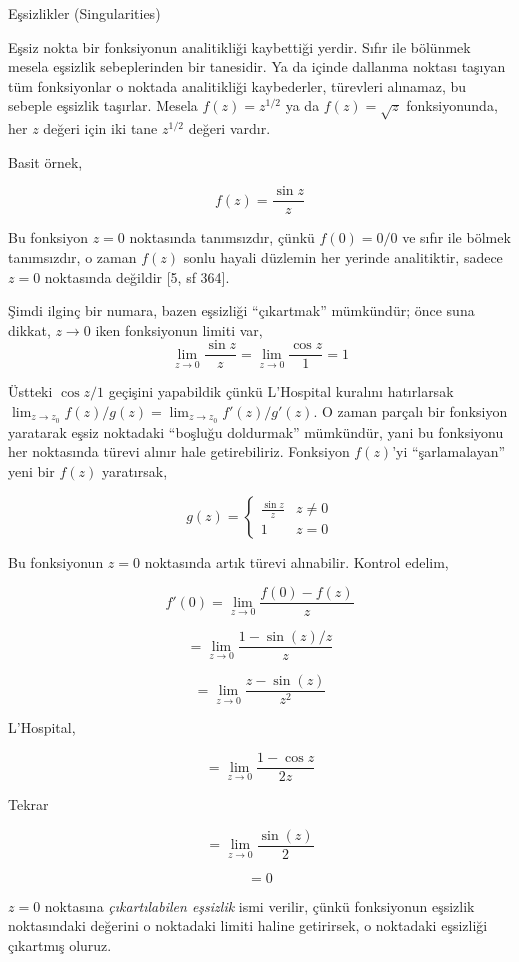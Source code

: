 \documentclass[12pt,fleqn]{article}\usepackage{../../common}
\begin{document}
\newpage

Eşsizlikler (Singularities) 

Eşsiz nokta bir fonksiyonun analitikliği kaybettiği yerdir. Sıfır ile
bölünmek mesela eşsizlik sebeplerinden bir tanesidir. Ya da içinde dallanma
noktası taşıyan tüm fonksiyonlar o noktada analitikliği kaybederler,
türevleri alınamaz, bu sebeple eşsizlik taşırlar. Mesela $f(z) = z^{1/2}$
ya da $f(z) = \sqrt{z}$ fonksiyonunda, her $z$ değeri için iki tane
$z^{1/2}$ değeri vardır.

Basit örnek, 

$$ f(z) = \frac{ \sin z}{z} $$

Bu fonksiyon $z=0$ noktasında tanımsızdır, çünkü $f(0) = 0/0$ ve sıfır ile
bölmek tanımsızdır, o zaman $f(z)$ sonlu hayali düzlemin her yerinde
analitiktir, sadece $z=0$ noktasında değildir [5, sf 364]. 

Şimdi ilginç bir numara, bazen eşsizliği ``çıkartmak'' mümkündür; önce suna
dikkat, $z \to 0$ iken fonksiyonun limiti var,
$$ \lim_{z \to 0} \frac{ \sin z}{z} = \lim_{z \to 0} \frac{\cos z}{1} = 1 $$


Üstteki $\cos z/1$ geçişini yapabildik çünkü L'Hospital kuralını
hatırlarsak $\lim_{z \to z_0} f(z)/g(z) = \lim_{z \to z_0} f'(z)/g'(z)$. O
zaman parçalı bir fonksiyon yaratarak eşsiz noktadaki ``boşluğu doldurmak''
mümkündür, yani bu fonksiyonu her noktasında türevi alınır hale
getirebiliriz. Fonksiyon $f(z)$'yi ``şarlamalayan'' yeni bir $f(z)$
yaratırsak,

$$ 
g(z) = \left\{ \begin{array}{ll}
\frac{\sin z}{z} & z \ne 0 \\
1 & z = 0
\end{array} \right.
 $$

Bu fonksiyonun $z=0$ noktasında artık türevi alınabilir. Kontrol edelim, 

$$ f'(0) = \lim_{z \to 0} \frac{f(0)-f(z)}{z}  $$

$$ = \lim_{z \to 0} \frac{1-\sin(z)/z}{z} $$

$$ = \lim_{z \to 0} \frac{z-\sin(z)}{z^2} $$

L'Hospital,

$$ = \lim_{z \to 0} \frac{1 - \cos z}{2z} $$

Tekrar

$$ = \lim_{z \to 0} \frac{ \sin(z)}{2} $$

$$ = 0 $$

$z=0$ noktasına {\em çıkartılabilen eşsizlik} ismi verilir, çünkü
fonksiyonun eşsizlik noktasındaki değerini o noktadaki limiti haline
getirirsek, o noktadaki eşsizliği çıkartmış oluruz. 
\end{document}
